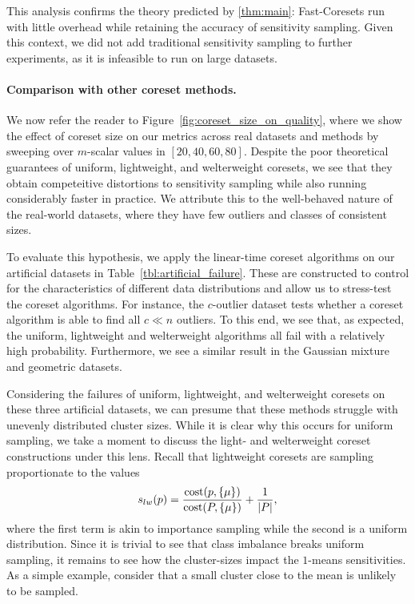 This analysis confirms the theory predicted by \cref{thm:main}: Fast-Coresets run with little overhead while retaining the accuracy of sensitivity sampling.
Given this context, we did not add traditional sensitivity sampling to further experiments, as it is infeasible to run on large datasets.


\paragraph*{Comparison with other coreset methods.}


We now refer the reader to Figure~\ref{fig:coreset_size_on_quality}, where we show the effect of coreset size on our metrics across real datasets and methods by
sweeping over $m$-scalar values in $[20, 40, 60, 80]$. Despite the poor theoretical guarantees of uniform, lightweight, and welterweight coresets, we see that
they obtain competeitive distortions to sensitivity sampling while also running considerably faster in practice. We attribute this to the well-behaved nature of
the real-world datasets, where they have few outliers and classes of consistent sizes.

To evaluate this hypothesis, we apply the linear-time coreset algorithms on our artificial datasets in Table~\ref{tbl:artificial_failure}. These are constructed
to control for the characteristics of different data distributions and allow us to stress-test the coreset algorithms. For instance, the $c$-outlier dataset
tests whether a coreset algorithm is able to find all $c \ll n$ outliers. To this end, we see that, as expected, the uniform, lightweight and welterweight
algorithms all fail with a relatively high probability. Furthermore, we see a similar result in the Gaussian mixture and geometric datasets.

Considering the failures of uniform, lightweight, and welterweight coresets on these three artificial datasets, we can presume that these methods
struggle with unevenly distributed cluster sizes. While it is clear why this occurs for uniform sampling, we take a moment to discuss the light- and
welterweight coreset constructions under this lens. Recall that lightweight coresets are sampling proportionate to the values
\[ s_{lw}(p) = \dfrac{\operatorname{cost}(p, \{\mu\})}{\operatorname{cost}(P, \{\mu\})} + \dfrac{1}{|P|},\]
where the first term is akin to importance sampling while the second is a uniform distribution. Since it is trivial to see that class imbalance breaks uniform
sampling, it remains to see how the cluster-sizes impact the $1$-means sensitivities. As a simple example, consider that a small cluster close to the mean
is unlikely to be sampled. 

